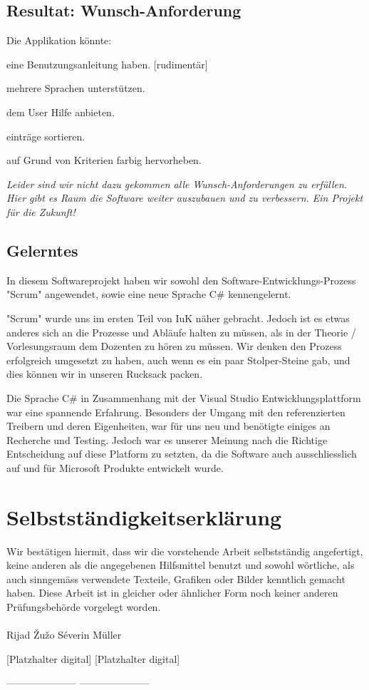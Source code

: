 \documentclass{article}
\begin{document}
\subsection{Resultat: Wunsch-Anforderung}
Die Applikation könnte:
\begin{description}
	\color{black}\item[W1:] eine Benutzungsanleitung haben. \color{green} {} \color{black}[rudimentär]
	\color{black}\item[W2:] mehrere Sprachen unterstützen.  \color{red}
	\color{black}\item[W3:] dem User Hilfe anbieten. \color{red}
	\color{black}\item[W4:] einträge sortieren. \color{red}
	\color{black}\item[W5:] auf Grund von Kriterien farbig hervorheben. \color{red}
\end{description}
\vspace{5mm}
\textit{Leider sind wir nicht dazu gekommen alle Wunsch-Anforderungen zu erfüllen. Hier gibt es Raum die Software weiter auszubauen und zu verbessern. Ein Projekt für die Zukunft!}
\subsection{Gelerntes}

In diesem Softwareprojekt haben wir sowohl den Software-Entwicklungs-Prozess "Scrum" angewendet, sowie eine neue Sprache C\# kennengelernt.

"Scrum" wurde uns im ersten Teil von IuK näher gebracht. Jedoch ist es etwas anderes sich an die Prozesse und Abläufe halten zu müssen, als in der Theorie / Vorlesungsraum dem Dozenten zu hören zu müssen. Wir denken den Prozess erfolgreich umgesetzt zu haben, auch wenn es ein paar Stolper-Steine gab, und dies können wir in unseren Rucksack packen.

Die Sprache C\# in Zusammenhang mit der Visual Studio Entwicklungsplattform war eine spannende Erfahrung. Besonders der Umgang mit den referenzierten Treibern und deren Eigenheiten, war für uns neu und benötigte einiges an Recherche und Testing. Jedoch war es unserer Meinung nach die Richtige Entscheidung auf diese Platform zu setzten, da die Software auch ausschliesslich auf und für Microsoft Produkte entwickelt wurde.

\section{Selbstständigkeitserklärung}
Wir bestätigen hiermit, dass wir die vorstehende Arbeit selbstständig angefertigt,
keine anderen als die angegebenen Hilfsmittel benutzt und sowohl wörtliche, als auch sinngemäss
verwendete Texteile, Grafiken oder Bilder kenntlich gemacht haben.
Diese Arbeit ist in gleicher oder ähnlicher Form noch keiner anderen Prüfungsbehörde vorgelegt
worden. 
\\
\\

\centering
Rijad \v{Z}u\v{z}o \hspace{80mm}Séverin Müller


\vspace{15mm}

[Platzhalter digital] \hspace{70mm} [Platzhalter digital]

--------------------- \hspace{73mm}---------------------
\end{document}
